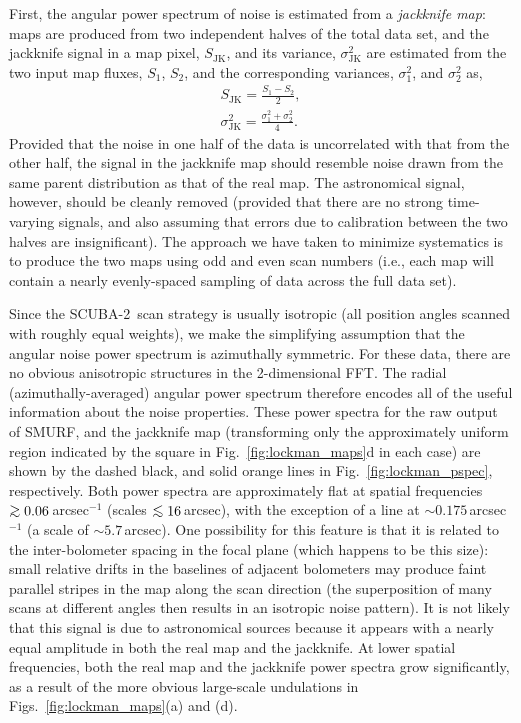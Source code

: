 \documentclass[useAMS,usenatbib,nofootinbib]{mn2e}
\newcommand{\scuba}{SCUBA-2}
\def\lsim{\mathrel{\lower2.5pt\vbox{\lineskip=0pt\baselineskip=0pt
          \hbox{$<$}\hbox{$\sim$}}}}
\def\gsim{\mathrel{\lower2.5pt\vbox{\lineskip=0pt\baselineskip=0pt
          \hbox{$>$}\hbox{$\sim$}}}}
\begin{document}
First, the angular power spectrum of noise is estimated from a
\emph{jackknife map}: maps are produced from two independent halves of
the total data set, and the jackknife signal in a map pixel,
$S_\mathrm{JK}$, and its variance, $\sigma^2_\mathrm{JK}$ are
estimated from the two input map fluxes, $S_1$, $S_2$, and the
corresponding variances, $\sigma^2_1$, and $\sigma^2_2$ as,
%
\begin{eqnarray}
S_\mathrm{JK} = \frac{S_1 - S_2}{2}, \\
\sigma^2_\mathrm{JK} = \frac{\sigma^2_1 + \sigma^2_2}{4}.
\end{eqnarray}
%
Provided that the noise in one half of the data is uncorrelated with
that from the other half, the signal in the jackknife map should
resemble noise drawn from the same parent distribution as that of the
real map. The astronomical signal, however, should be cleanly removed
(provided that there are no strong time-varying signals, and also
assuming that errors due to calibration between the two halves are
insignificant). The approach we have taken to minimize systematics is
to produce the two maps using odd and even scan numbers (i.e., each
map will contain a nearly evenly-spaced sampling of data across the
full data set).

Since the \scuba\ scan strategy is usually isotropic (all position
angles scanned with roughly equal weights), we make the simplifying
assumption that the angular noise power spectrum is azimuthally
symmetric. For these data, there are no obvious anisotropic structures
in the 2-dimensional FFT. The radial (azimuthally-averaged) angular
power spectrum therefore encodes all of the useful information about
the noise properties. These power spectra for the raw output of SMURF,
and the jackknife map (transforming only the approximately uniform
region indicated by the square in Fig.~\ref{fig:lockman_maps}d in each
case) are shown by the dashed black, and solid orange lines in
Fig.~\ref{fig:lockman_pspec}, respectively. Both power spectra are
approximately flat at spatial frequencies $\gsim 0.06$\,arcsec$^{-1}$
(scales $\lsim16$\,arcsec), with the exception of a line at
$\sim0.175$\,arcsec$^{-1}$ (a scale of $\sim5.7$\,arcsec). One
possibility for this feature is that it is related to the
inter-bolometer spacing in the focal plane (which happens to be this
size): small relative drifts in the baselines of adjacent bolometers
may produce faint parallel stripes in the map along the scan direction
(the superposition of many scans at different angles then results in
an isotropic noise pattern). It is not likely that this signal is due
to astronomical sources because it appears with a nearly equal
amplitude in both the real map and the jackknife.  At lower spatial
frequencies, both the real map and the jackknife power spectra grow
significantly, as a result of the more obvious large-scale undulations
in Figs.~\ref{fig:lockman_maps}(a) and (d).
\end{document}
